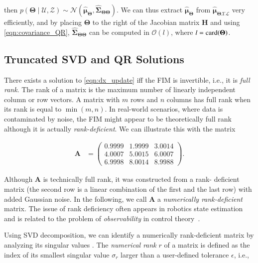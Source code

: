 \noindent then $p(\boldsymbol{\Theta}\mid\mathcal{U},\mathcal{Z})\sim\mathcal{N}
(\hat{\boldsymbol{\mu}}_{\boldsymbol{\Theta}},
\hat{\boldsymbol{\Sigma}}_{\boldsymbol{\Theta}\boldsymbol{\Theta}})$. We can
thus extract $\hat{\boldsymbol{\mu}}_{\boldsymbol{\Theta}}$ from
$\hat{\boldsymbol{\mu}}_{\boldsymbol{\Theta}\mathcal{X}\mathcal{L}}$ very
efficiently, and by placing $\boldsymbol{\Theta}$ to the right of the Jacobian
matrix $\mathbf{H}$ and using \eqref{eqn:covariance_QR},
$\hat{\boldsymbol{\Sigma}}_{\boldsymbol{\Theta}\boldsymbol{\Theta}}$ can be
computed in $\mathcal{O}(l)$, where $l=\operatorname{card}(\boldsymbol{\Theta})$.

\subsection{Truncated SVD and QR Solutions}

There exists a solution to \eqref{eqn:dx_update}
iff the FIM is invertible, i.e., it is \emph{full rank}. The rank of a
matrix is the maximum number of linearly independent column or row vectors. A
matrix with $m$ rows and $n$ columns has full rank when its rank is equal to
$\min(m,n)$. In real-world scenarios, where data is contaminated by noise, the
FIM might appear to be theoretically full rank although it is actually
\emph{rank-deficient}. We can illustrate this with the matrix

\begin{equation}\label{eqn:rank_deficient_matrix}
  \begin{aligned}
    \mathbf{A} &=
    \begin{pmatrix}
    0.9999&1.9999&3.0014\\
    4.0007&5.0015&6.0007\\
    6.9998&8.0014&8.9988
    \end{pmatrix}.
  \end{aligned}
\end{equation}

Although $\mathbf{A}$ is technically full rank, it was constructed from a rank-
deficient matrix (the second row is a linear combination of the first and the
last row) with added Gaussian noise. In the following, we call $\mathbf{A}$
a \emph{numerically rank-deficient} matrix. The issue of rank deficiency often
appears in robotics state estimation and is related to the problem of
\emph{observability} in control theory~\cite{jauffret07observability}.

Using SVD decomposition, we can identify a numerically rank-deficient matrix by
analyzing its singular values \cite{hansen98rank}. The \emph{numerical rank}
$r$ of a matrix is defined as the index of its smallest singular value
$\sigma_r$ larger than a user-defined tolerance $\epsilon$, i.e.,

